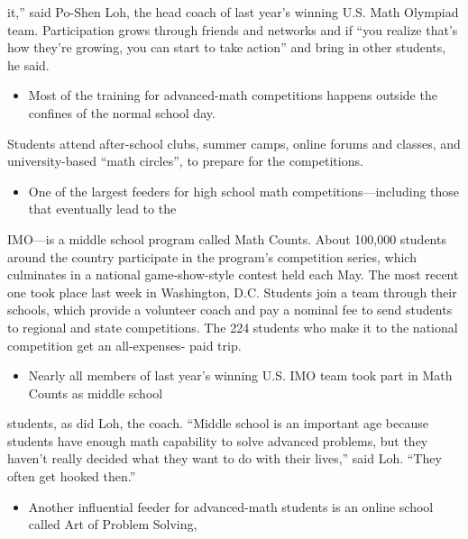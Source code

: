 \documentclass[UTF8,11pt]{ctexart}
\begin{document}
it,” said Po-Shen Loh, the head coach of last year’s winning U.S. Math Olympiad team. Participation grows through friends and networks and if “you realize that’s how they’re growing, you can start to take action” and bring in other students, he said.


\begin{itemize}[leftmargin=2em,itemsep=.2em,topsep=.4em]\item[D.] Most of the training for advanced-math competitions happens outside the confines of the normal school day.
\end{itemize}

Students attend after-school clubs, summer camps, online forums and classes, and university-based “math circles”, to prepare for the competitions.


\begin{itemize}[leftmargin=2em,itemsep=.2em,topsep=.4em]\item[E.] One of the largest feeders for high school math competitions—including those that eventually lead to the
\end{itemize}

IMO—is a middle school program called Math Counts. About 100,000 students around the country participate in the program’s competition series, which culminates in a national game-show-style contest held each May. The most recent one took place last week in Washington, D.C. Students join a team through their schools, which provide a volunteer coach and pay a nominal fee to send students to regional and state competitions. The 224 students who make it to the national competition get an all-expenses- paid trip.


\begin{itemize}[leftmargin=2em,itemsep=.2em,topsep=.4em]\item[F.] Nearly all members of last year’s winning U.S. IMO team took part in Math Counts as middle school
\end{itemize}

students, as did Loh, the coach. “Middle school is an important age because students have enough math capability to solve advanced problems, but they haven’t really decided what they want to do with their lives,” said Loh. “They often get hooked then.”


\begin{itemize}[leftmargin=2em,itemsep=.2em,topsep=.4em]\item[G.] Another influential feeder for advanced-math students is an online school called Art of Problem Solving,
\end{itemize}
\end{document}
